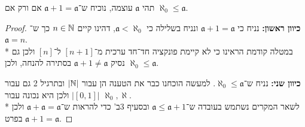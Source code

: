 \Question{}
תהי $\mathfrak{a}$ עוצמה, נוכיח ש־$\mathfrak{a} + 1 = \mathfrak{a}$ אם ורק אם $\aleph_0 \le \mathfrak{a}$.
\begin{proof}
	\textbf{כיוון ראשון:}
	נניח כי $\mathfrak{a} + 1 = \mathfrak{a}$ ונניח בשלילה כי $\mathfrak{a} < \aleph_0$, דהינו קיים $n \in \mathbb{N}$ כך ש־$\mathfrak{a} = n$. \\*
	במטלה קודמת הראינו כי לא קיימת פונקציה חד־חד ערכית מ־$[n + 1]$ ל־$[n]$ ולכן גם נסיק $\mathfrak{a} + 1 \ne \mathfrak{a}$ בסתירה להנחה, ולכן $\aleph_0 \le \mathfrak{a}$.

	\textbf{כיוון שני:}
	נניח ש־$\aleph_0 \le \mathfrak{a}$.
	למעשה הוכחנו כבר את הטענה הן עבור $|\mathbb{N}|$ ובתרגיל 2 גם עבור $|[0, 1]|$ ולכן היא נכונה עבור $\aleph_0, \aleph$. \\*
	לשאר המקרים נשתמש בעובדה ש־$\mathfrak{a} \le \mathfrak{a} + 1$ ובסעיף 3ב' כדי להראות ש־$\mathfrak{a} + \mathfrak{a} = \mathfrak{a}$ ולכן בפרט $\mathfrak{a} + 1 = \mathfrak{a}$.
\end{proof}


